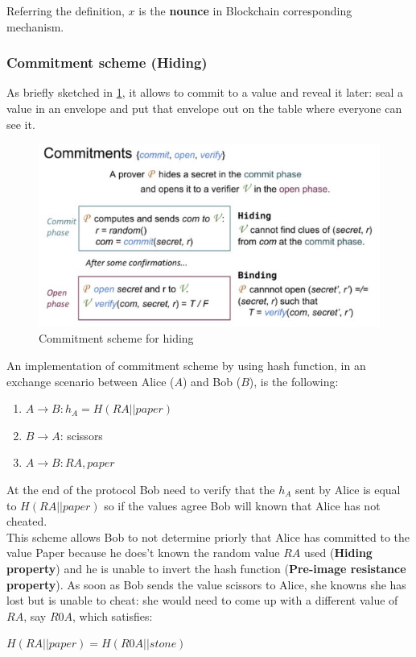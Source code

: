 \documentclass[10pt,a4paper]{report}
\begin{document}
Referring the definition, $x$ is the \textbf{nounce} in Blockchain corresponding mechanism.
\subsubsection{Commitment scheme (Hiding)}\label{sec:commitment-scheme-hiding}
As briefly sketched in \ref{commitment-scheme}, it allows to commit to a value and reveal it later: seal a value in an envelope and put that envelope out on the table where everyone can see it.
\begin{figure}[h!]
	\centering
	\includegraphics[scale=0.50]{images/Pasted image 20230315115544.png}
	\caption{Commitment scheme for hiding}
	\label{commitment-scheme}
\end{figure}
An implementation of commitment scheme by using hash function, in an exchange scenario between Alice (\textit{$A$}) and Bob (\textit{$B$}), is the following:
\begin{enumerate}
	\item 
	$A \rightarrow B : h_{A} = H(RA || paper)$
	\item 
	$B \rightarrow A$: scissors
	\item 
	$A \rightarrow B: RA, paper$
	
	
\end{enumerate}
At the end of the protocol Bob need to verify that the $h_{A}$ sent by Alice is equal to $H(RA || paper)$ so if the values agree Bob will known that Alice has not cheated.\\
This scheme allows Bob to not determine priorly that Alice has committed to the value Paper because he does't known the random value $RA$ used (\textbf{Hiding property}) and he is unable to invert the hash function (\textbf{Pre-image resistance property}).  As soon as Bob sends the value scissors to Alice, she knowns she has lost but is unable to cheat: she would need to come up with a different value of $RA$, say $R0A$, which satisfies:
\begin{center}
$H(RA||paper) = H(R0A || stone)$
\end{center}
\end{document}
